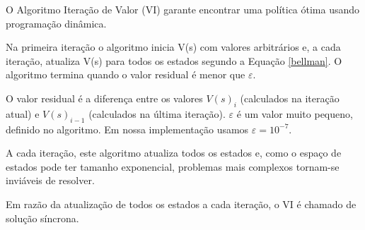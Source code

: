 O Algoritmo Iteração de Valor (VI) \cite{Bellman57} garante encontrar uma política ótima usando programação dinâmica. 

Na primeira iteração o algoritmo inicia V(s) com valores arbitrários e, a cada iteração, atualiza V(s) para todos os estados segundo a Equação \ref{bellman}. O algoritmo termina quando o valor residual é menor que $\varepsilon$.

O valor residual é a diferença entre os valores $V(s)_i$ (calculados na iteração atual) e $V(s)_{i-1}$ (calculados na última iteração). $\varepsilon$ é um valor muito pequeno, definido no algoritmo. Em nossa implementação usamos $\varepsilon=10^{-7}$.

A cada iteração, este algoritmo atualiza todos os estados e, como o espaço de estados pode ter tamanho exponencial, problemas mais complexos tornam-se inviáveis de resolver.

Em razão da atualização de todos os estados a cada iteração, o VI é chamado de solução síncrona.